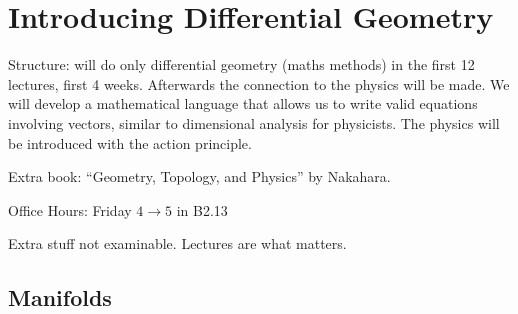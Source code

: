 \chapter{Introducing Differential Geometry}%

Structure: will do only differential geometry (maths methods) in the first 12 lectures, first 4 weeks. Afterwards the connection to the physics will be made.
We will develop a mathematical language that allows us to write valid equations involving vectors, similar to dimensional analysis for physicists. The physics will be introduced with the action principle.

Extra book: ``Geometry, Topology, and Physics'' by Nakahara.

Office Hours: Friday $4 \rightarrow 5$ in B2.13

Extra stuff not examinable. Lectures are what matters.

\section{Manifolds}%
\label{sec:manifolds}

